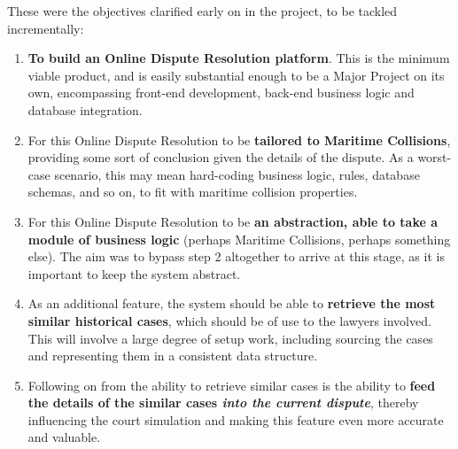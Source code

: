These were the objectives clarified early on in the project, to be tackled incrementally:

\begin{enumerate}

    \item \textbf{To build an Online Dispute Resolution platform}. This is the minimum viable product, and is easily substantial enough to be a Major Project on its own, encompassing front-end development, back-end business logic and database integration.

    \item For this Online Dispute Resolution to be \textbf{tailored to Maritime Collisions}, providing some sort of conclusion given the details of the dispute. As a worst-case scenario, this may mean hard-coding business logic, rules, database schemas, and so on, to fit with maritime collision properties.

    \item For this Online Dispute Resolution to be \textbf{an abstraction, able to take a module of business logic} (perhaps Maritime Collisions, perhaps something else). The aim was to bypass step 2 altogether to arrive at this stage, as it is important to keep the system abstract.

    \item As an additional feature, the system should be able to \textbf{retrieve the most similar historical cases}, which should be of use to the lawyers involved. This will involve a large degree of setup work, including sourcing the cases and representing them in a consistent data structure.

    \item Following on from the ability to retrieve similar cases is the ability to \textbf{feed the details of the similar cases \emph{into the current dispute}}, thereby influencing the court simulation and making this feature even more accurate and valuable.

\end{enumerate}